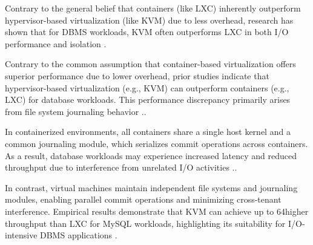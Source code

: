 Contrary to the general belief that containers (like LXC) inherently outperform hypervisor-based virtualization (like KVM) due to less overhead, research has shown that for DBMS workloads, KVM often outperforms LXC in both I/O performance and isolation \cite{Containers_or_Hypervisors_Which_is_Better_for_Database_Consolidation}.

Contrary to the common assumption that container-based virtualization offers superior performance due to lower overhead, prior studies indicate that hypervisor-based virtualization (e.g., KVM) can outperform containers (e.g., LXC) for database workloads. This performance discrepancy primarily arises from file system journaling behavior \cite{Containers_or_Hypervisors_Which_is_Better_for_Database_Consolidation}..

In containerized environments, all containers share a single host kernel and a common journaling module, which serializes commit operations across containers. As a result, database workloads may experience increased latency and reduced throughput due to interference from unrelated I/O activities \cite{Containers_or_Hypervisors_Which_is_Better_for_Database_Consolidation}..

In contrast, virtual machines maintain independent file systems and journaling modules, enabling parallel commit operations and minimizing cross-tenant interference. Empirical results demonstrate that KVM can achieve up to 64higher throughput than LXC for MySQL workloads, highlighting its suitability for I/O-intensive DBMS applications \cite{Containers_or_Hypervisors_Which_is_Better_for_Database_Consolidation}.

        
        

